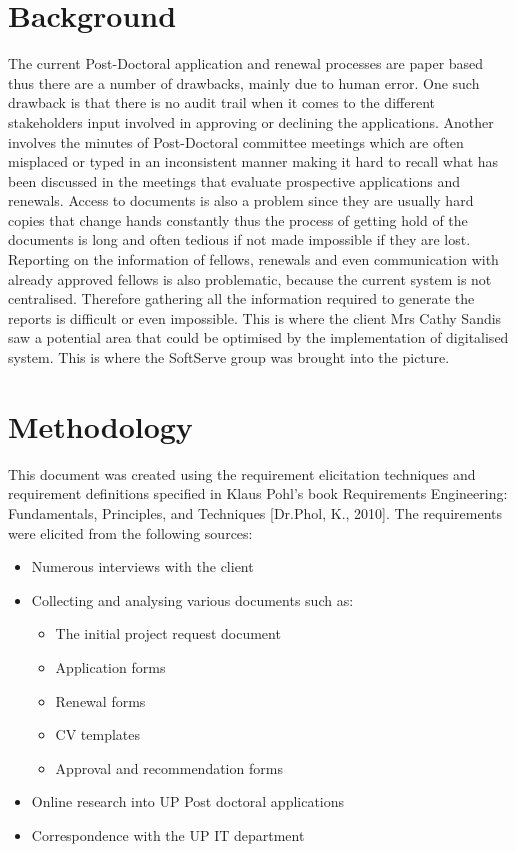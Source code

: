 \documentclass[12pt]{article}
\begin{document}
	\section{Background} %
	\vspace{0.2in}
	The current Post-Doctoral application and renewal processes are paper based thus there are a number of drawbacks, mainly due to human error. One such drawback is that there is no audit trail when it comes to the different stakeholders input involved in approving or declining the applications. Another involves the minutes of Post-Doctoral committee meetings which are often misplaced or typed in an inconsistent manner making it hard to recall what has been discussed in the meetings that evaluate prospective applications and renewals. Access to documents is also a problem since they are usually hard copies that change hands constantly thus the process of getting hold of the documents is long and often tedious if not made impossible if they are lost. Reporting on the information of fellows, renewals and even communication with already approved fellows is also problematic, because the current system is not centralised. Therefore gathering all the information required to generate the reports is difficult or even impossible. This is where the client Mrs Cathy Sandis saw a potential area that could be optimised by the implementation of digitalised system. This is where the SoftServe group was brought into the picture. 
	\vspace{0.5in}
	
	\newpage
	\section{Methodology} %
	\vspace{0.2in}
	
	This document was created using the requirement elicitation techniques and requirement definitions specified in Klaus Pohl’s book Requirements Engineering: Fundamentals, Principles, and Techniques [Dr.Phol, K., 2010].
	The requirements were elicited from the following sources:
	\begin{itemize}
		\item Numerous interviews with the client
		\item Collecting and analysing various documents such as:
		\begin{itemize}
			\item The initial project request document
			\item Application forms
			\item Renewal forms
			\item CV templates
			\item Approval and recommendation forms			 
		\end{itemize}		
		\item Online research into UP Post doctoral applications
		\item Correspondence with the UP IT department
	\end{itemize}	
	
\end{document}
